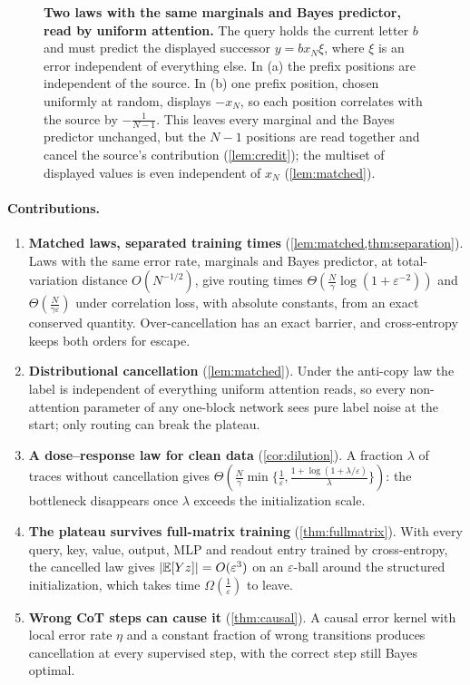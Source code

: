 \begin{figure}[t]
\centering
\resizebox{\linewidth}{!}{}
\caption{\textbf{Two laws with the same marginals and Bayes predictor, read by uniform attention.} The query holds the current letter $b$ and
must predict the displayed successor $y=b x_N \xi$, where $\xi$ is an error independent of everything else. In (a) the prefix
positions are independent of the source. In (b) one prefix position, chosen uniformly at random, displays $-x_N$, so each position
correlates with the source by $-\tfrac{1}{N-1}$. This leaves every marginal and the Bayes predictor unchanged, but the $N-1$ positions are read
together and cancel the source's contribution (\cref{lem:credit}); the multiset of displayed values is even independent of $x_N$ (\cref{lem:matched}).}
\label{fig:cancel}
\end{figure}

\paragraph{Contributions.}
\begin{enumerate}[leftmargin=*,itemsep=2pt,topsep=2pt]
\item \textbf{Matched laws, separated training times} (\cref{lem:matched,thm:separation}). Laws with the same error rate, marginals and Bayes predictor,
at total-variation distance $O(N^{-1/2})$, give routing times $\Theta(\tfrac{N}{\gamma}\log(1+\varepsilon^{-2}))$ and $\Theta(\tfrac{N}{\gamma\varepsilon})$ under correlation loss,
with absolute constants, from an exact conserved quantity. Over-cancellation has an exact barrier, and cross-entropy keeps both orders for escape.
\item \textbf{Distributional cancellation} (\cref{lem:matched}). Under the anti-copy law the label is independent of everything uniform attention reads,
so every non-attention parameter of any one-block network sees pure label noise at the start; only routing can break the plateau.
\item \textbf{A dose--response law for clean data} (\cref{cor:dilution}). A fraction $\lambda$ of traces without cancellation gives
$\Theta(\tfrac{N}{\gamma}\min\{\tfrac{1}{\varepsilon},\tfrac{1+\log(1+\lambda/\varepsilon)}{\lambda}\})$: the bottleneck disappears once $\lambda$ exceeds the initialization scale.
\item \textbf{The plateau survives full-matrix training} (\cref{thm:fullmatrix}). With every query, key, value, output, MLP and readout entry trained by
cross-entropy, the cancelled law gives $|\mathbb E[Yz]|=O(\varepsilon^3)$ on an $\varepsilon$-ball around the structured initialization, which takes time $\Omega(\tfrac{1}{\varepsilon})$ to leave.
\item \textbf{Wrong CoT steps can cause it} (\cref{thm:causal}). A causal error kernel with local error rate $\eta$ and a constant fraction of wrong transitions
produces cancellation at every supervised step, with the correct step still Bayes optimal.
\end{enumerate}

